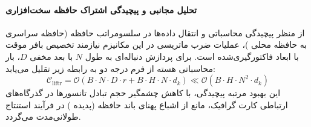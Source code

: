 \paragraph{تحلیل مجانبی و پیچیدگی اشتراک حافظه سخت‌افزاری}
از منظر پیچیدگی محاسباتی و انتقال داده‌ها در سلسومراتب حافظه (حافظه سراسری  به حافظه محلی )، عملیات ضرب ماتریسی در این مکانیزم نیازمند تخصیص بافر موقت با ابعاد فاکتورگیری‌شده است. برای پردازش دنباله‌ای به طول $N$ با بعد مخفی $D$، بار محاسباتی هسته از فرم درجه دو به رابطه زیر تقلیل می‌یابد:
\begin{equation}
\label{eq:complexity_liftr}
\mathcal{C}_{\text{liftr}} = \mathcal{O}\left( B \cdot N \cdot D \cdot r + B \cdot H \cdot N \cdot d_k \right) \ll \mathcal{O}\left( B \cdot H \cdot N^2 \cdot d_k \right)
\end{equation}
این بهبود مرتبه پیچیدگی، با کاهش چشمگیر حجم تبادل تانسورها در گذرگاه‌های ارتباطی کارت گرافیک، مانع از اشباع پهنای باند حافظه (پدیده ) در فرآیند استنتاج طولانی‌مدت می‌گردد.
